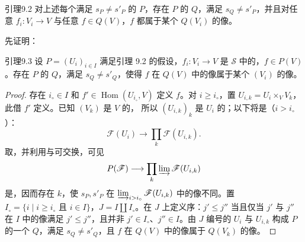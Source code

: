 \begin{SGAresult}{引理}{9.2}
对上述每个满足 $s_P\ne s'_P$ 的 $P$，存在 $P$ 的 $Q$，满足 $s_Q\ne s'_P$，并且对任意 $f_i:V_i\to V$ 与任意 $f\in Q(V)$，$f$ 都属于某个 $Q(V_i)$ 的像。
\end{SGAresult}
先证明：
\begin{SGAresult}{引理}{9.3}
设 $P=(U_i)_{i\in I}$ 满足引理 9.2 的假设，$f_i:V_i\to V$ 是 $\mathscr S$ 中的，$f\in P(V)$。存在 $P$ 的 $Q$，满足 $s_Q\ne s'_Q$，使得 $f$ 在 $Q(V)$ 中的像属于某个 $(V_i)$ 的像。
\end{SGAresult}
\begin{proof}
存在 $i_\circ\in I$ 和 $f'\in\operatorname{Hom}(U_{i_\circ},V)$ 定义 $f$。对 $i\geq i_\circ$，置 $U_{i,k}=U_i\times_VV_k$，此借 $f'$ 定义。已知 $(V_k)$ 是 $V$ 的，
所以 $(U_{i,k})_k$ 是 $U_i$ 的；以下将是（$i>i_\circ$）：
\[
 \mathscr F(U_i)\longrightarrow\prod_k\mathscr F(U_{i,k}).
\]
取，并利用与可交换，可见
\[
 P(\mathscr F)\longrightarrow\prod_k\varinjlim\mathscr F(U_{i,k})
\]
是，因而存在 $k$，使 $s_P,s'_P$ 在 $\varinjlim_{i>i_\circ}\mathscr F(U_{i,k})$ 中的像不同。置 $I_\circ=\{i\mid i\geq i_\circ\text{ 且 }i\in I\}$，$J=I\amalg I_\circ$。在 $J$ 上定义序：$j'\leq j''$ 当且仅当 $j'$ 与 $j''$ 在 $I$ 中的像满足 $j'\leq j''$，且并非 $j'\in I_\circ$、$j''\in I$。由 $J$ 编号的 $U_i$ 与 $U_{i,k}$ 构成 $P$ 的一个 $Q$，满足 $s_Q\ne s'_Q$，且 $f$ 在 $Q(V)$ 中的像属于 $Q(V_k)$ 的像。
\end{proof}

